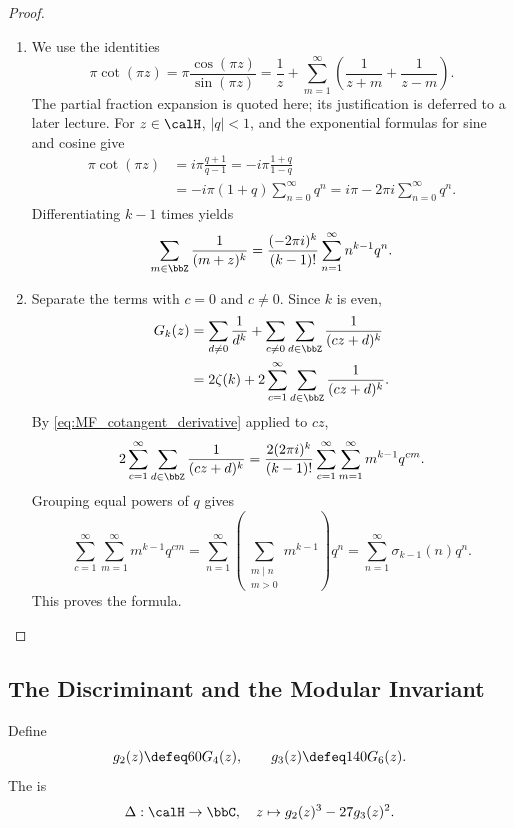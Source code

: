 \begin{proof}
    \leavevmode
    \begin{enumerate}[label=\textit{Step~\arabic*.}]
        \item We use the identities
        \[
            \pi\cot(\pi z) = \pi\frac{\cos(\pi z)}{\sin(\pi z)} = \frac{1}{z} + \sum_{m = 1}^{\infty}\left(\frac{1}{z + m} + \frac{1}{z - m}\right).
        \]
        The partial fraction expansion is quoted here; its justification is deferred to a later lecture. For $z \in \calH$, $|q| < 1$, and the exponential formulas for sine and cosine give
        \[
            \begin{aligned}
                \pi\cot(\pi z) &= i\pi\frac{q + 1}{q - 1} = -i\pi\frac{1 + q}{1 - q}\\
                &= -i\pi(1 + q)\sum_{n = 0}^{\infty}q^n = i\pi - 2\pi i\sum_{n = 0}^{\infty}q^n.
            \end{aligned}
        \]
        Differentiating $k - 1$ times yields
        \begin{equation}\label{eq:MF_cotangent_derivative}
            \sum_{m \in \bbZ}\frac{1}{(m + z)^k} = \frac{(-2\pi i)^k}{(k - 1)!}\sum_{n = 1}^{\infty}n^{k - 1}q^n.
        \end{equation}

        \item Separate the terms with $c = 0$ and $c \neq 0$. Since $k$ is even,
        \[
            \begin{aligned}
                G_k(z) &= \sum_{d \neq 0}\frac{1}{d^k} + \sum_{c \neq 0}\sum_{d \in \bbZ}\frac{1}{(cz + d)^k}\\
                &= 2\zeta(k) + 2\sum_{c = 1}^{\infty}\sum_{d \in \bbZ}\frac{1}{(cz + d)^k}.
            \end{aligned}
        \]
        By \eqref{eq:MF_cotangent_derivative} applied to $cz$,
        \[
            2\sum_{c = 1}^{\infty}\sum_{d \in \bbZ}\frac{1}{(cz + d)^k} = \frac{2(2\pi i)^k}{(k - 1)!}\sum_{c = 1}^{\infty}\sum_{m = 1}^{\infty}m^{k - 1}q^{cm}.
        \]
        Grouping equal powers of $q$ gives
        \[
            \sum_{c = 1}^{\infty}\sum_{m = 1}^{\infty}m^{k - 1}q^{cm} = \sum_{n = 1}^{\infty}\left(\sum_{\substack{m \mid n\\m > 0}}m^{k - 1}\right)q^n = \sum_{n = 1}^{\infty}\sigma_{k - 1}(n)q^n.
        \]
        This proves the formula.
    \end{enumerate}
\end{proof}

\subsection{The Discriminant and the Modular Invariant}\label{Sec:MF_discriminant}
\begin{definition}
    Define
    \[
        g_2(z) \defeq 60G_4(z), \qquad g_3(z) \defeq 140G_6(z).
    \]
    The  is
    \[
        \Delta : \calH \to \bbC, \quad z \mapsto g_2(z)^3 - 27g_3(z)^2.
    \]
\end{definition}

